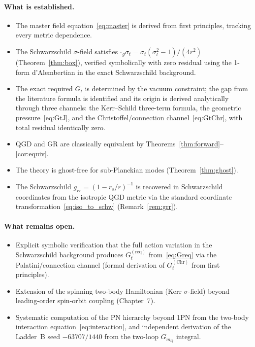 \documentclass[11pt,a4paper]{article}
\theoremstyle{plain}
\theoremstyle{definition}
\theoremstyle{remark}
\newcommand{\sigt}{\sigma_t}
\newcommand{\rs}{r_s}
\newcommand{\boxg}{\square_g}
\begin{document}
\paragraph{What is established.}
\begin{itemize}[nosep]
  \item The master field equation~\eqref{eq:master} is derived from first principles,
    tracking every metric dependence.
  \item The Schwarzschild $\sigma$-field satisfies $\boxg\sigt = \sigt(\sigt^2-1)/(4r^2)$
    (Theorem~\ref{thm:box}), verified symbolically with zero residual using the
    1-form d'Alembertian in the exact Schwarzschild background.
  \item The exact required $G_t$ is determined by the vacuum constraint; the gap
    from the literature formula is identified and its origin is derived analytically
    through three channels: the Kerr--Schild three-term formula, the geometric
    pressure~\eqref{eq:GtJ}, and the Christoffel/connection channel~\eqref{eq:GtChr},
    with total residual identically zero.
  \item QGD and GR are classically equivalent by Theorems~\ref{thm:forward}--\ref{cor:equiv}.
  \item The theory is ghost-free for sub-Planckian modes (Theorem~\ref{thm:ghost}).
  \item The Schwarzschild $g_{rr} = (1-\rs/r)^{-1}$ is recovered in Schwarzschild
    coordinates from the isotropic QGD metric via the standard coordinate
    transformation~\eqref{eq:iso_to_schw} (Remark~\ref{rem:grr}).
\end{itemize}

\paragraph{What remains open.}
\begin{itemize}[nosep]
  \item Explicit symbolic verification that the full action variation in the
    Schwarzschild background produces $G_t^{(\mathrm{req})}$ from~\eqref{eq:Greq}
    via the Palatini/connection channel (formal derivation of $G_t^{(\mathrm{Chr})}$
    from first principles).
  \item Extension of the spinning two-body Hamiltonian (Kerr $\sigma$-field) beyond
    leading-order spin-orbit coupling (Chapter~7).
  \item Systematic computation of the PN hierarchy beyond 1PN from the two-body
    interaction equation~\eqref{eq:interaction}, and independent derivation
    of the Ladder~B seed $-63707/1440$ from the two-loop $G_{m_Q}$ integral.
\end{itemize}
\end{document}
